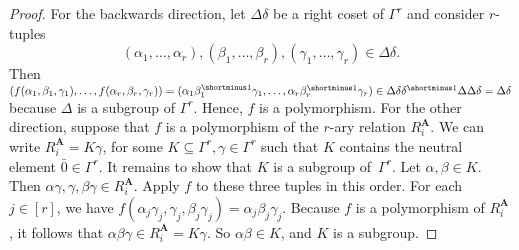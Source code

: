 \documentclass[a4paper,english, thm-restate]{lipics-v2021}
\newcommand{\inv}[1]{#1^{\shortminus 1}}
\newcommand{\StructA}{\mathbf{A}}
\begin{document}
	
	\groupCSPMaltsev*
	\begin{proof}
		For the backwards direction,
		let $\Delta\delta$ be a right coset of $\Gamma^r$
		and consider $r$-tuples
		\[
		(\alpha_1,\dots,\alpha_r), (\beta_1,\dots,\beta_r), (\gamma_1,\dots,\gamma_r) \in \Delta\delta.
		\]
		Then
		$(f(\alpha_1,\beta_1,\gamma_1), \dots, f(\alpha_r, \beta_r, \gamma_r))
		= (\alpha_1\inv{\beta_1}\gamma_1, \dots , \alpha_r\inv{\beta_r}\gamma_r)
		\in \Delta\delta\inv{\delta}\Delta\Delta\delta = \Delta\delta$
		because $\Delta$ is a subgroup of $\Gamma^r$.
		Hence, $f$ is a polymorphism.
		For the other direction, suppose that $f$ is a polymorphism of the $r$-ary relation $R_i^{\StructA}$. We can write $R_i^{\StructA} = K\gamma$, for some $K \subseteq \Gamma^r, \gamma \in \Gamma^r$ such that $K$ contains the neutral element $\bar{0} \in \Gamma^r$. It remains to show that $K$ is a subgroup of~$\Gamma^r$. Let $\alpha, \beta \in K$. Then $\alpha\gamma, \gamma, \beta\gamma \in R_i^{\StructA}$. Apply $f$ to these three tuples in this order. For each $j \in [r]$, we have $f(\alpha_j\gamma_j, \gamma_j, \beta_j\gamma_j) = \alpha_j \beta_j \gamma_j$. Because $f$ is a polymorphism of $R_i^{\StructA}$, it follows that $\alpha \beta \gamma \in R_i^{\StructA} = K\gamma$. So $\alpha \beta \in K$, and $K$ is a subgroup.
	\end{proof}	
	
\end{document}
